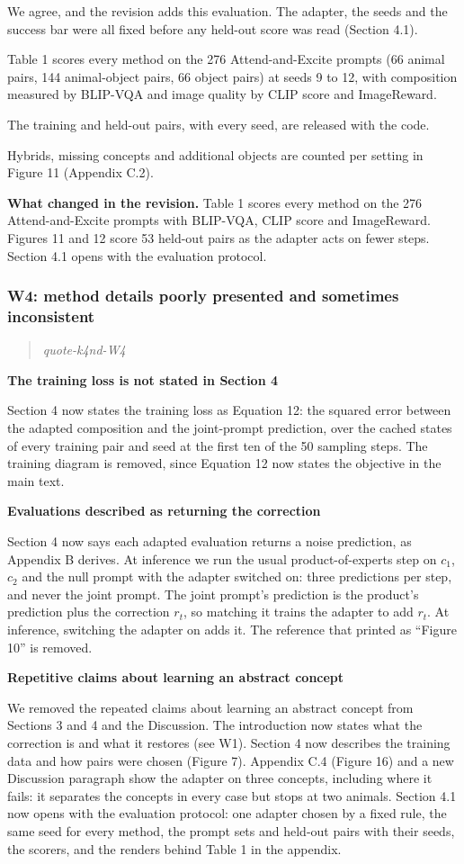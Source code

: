 \documentclass[11pt]{article}
\def\showquotes{}        %
\newcommand{\reviewquote}[2]{\ifdefined\showquotes\begin{quote}\color{rev}\itshape\csname quote-#1-#2\endcsname\end{quote}\fi}
\newcommand{\changed}[1]{\par{\color{chg}\textbf{What changed in the revision.}} #1\par}
\begin{document}
We agree, and the revision adds this evaluation. The adapter, the seeds and the success bar were all fixed before any held-out score was read (Section 4.1).

Table 1 scores every method on the 276 Attend-and-Excite prompts (66 animal pairs, 144 animal-object pairs, 66 object pairs) at seeds 9 to 12, with composition measured by BLIP-VQA and image quality by CLIP score and ImageReward.

The training and held-out pairs, with every seed, are released with the code.

Hybrids, missing concepts and additional objects are counted per setting in Figure 11 (Appendix C.2).

\changed{Table 1 scores every method on the 276 Attend-and-Excite prompts with BLIP-VQA, CLIP score and ImageReward. Figures 11 and 12 score 53 held-out pairs as the adapter acts on fewer steps. Section 4.1 opens with the evaluation protocol.}

\subsubsection*{W4: method details poorly presented and sometimes inconsistent}
\reviewquote{k4nd}{W4}

\textbf{The training loss is not stated in Section 4}

Section 4 now states the training loss as Equation 12: the squared error between the adapted composition and the joint-prompt prediction, over the cached states of every training pair and seed at the first ten of the 50 sampling steps. The training diagram is removed, since Equation 12 now states the objective in the main text.

\textbf{Evaluations described as returning the correction}

Section 4 now says each adapted evaluation returns a noise prediction, as Appendix B derives. At inference we run the usual product-of-experts step on $c_1$, $c_2$ and the null prompt with the adapter switched on: three predictions per step, and never the joint prompt. The joint prompt's prediction is the product's prediction plus the correction $r_t$, so matching it trains the adapter to add $r_t$. At inference, switching the adapter on adds it. The reference that printed as ``Figure 10'' is removed.

\textbf{Repetitive claims about learning an abstract concept}

We removed the repeated claims about learning an abstract concept from Sections 3 and 4 and the Discussion. The introduction now states what the correction is and what it restores (see W1). Section 4 now describes the training data and how pairs were chosen (Figure 7). Appendix C.4 (Figure 16) and a new Discussion paragraph show the adapter on three concepts, including where it fails: it separates the concepts in every case but stops at two animals. Section 4.1 now opens with the evaluation protocol: one adapter chosen by a fixed rule, the same seed for every method, the prompt sets and held-out pairs with their seeds, the scorers, and the renders behind Table 1 in the appendix.
\end{document}
